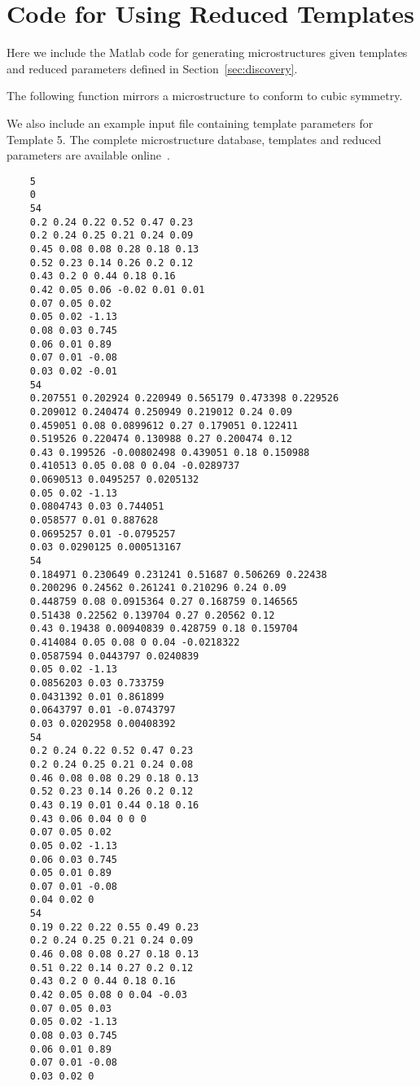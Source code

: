 \chapter{Code for Using Reduced Templates}
Here we include the Matlab code for generating microstructures given templates and reduced parameters defined in Section~\ref{sec:discovery}.

The following function mirrors a microstructure to conform to cubic symmetry.

We also include an example input file containing template parameters for Template 5.
The complete microstructure database, templates and reduced parameters are available online~\citep{microDatabase}.
\begin{verbatim}
	5
	0
	54
	0.2 0.24 0.22 0.52 0.47 0.23 
	0.2 0.24 0.25 0.21 0.24 0.09 
	0.45 0.08 0.08 0.28 0.18 0.13 
	0.52 0.23 0.14 0.26 0.2 0.12 
	0.43 0.2 0 0.44 0.18 0.16 
	0.42 0.05 0.06 -0.02 0.01 0.01 
	0.07 0.05 0.02 
	0.05 0.02 -1.13 
	0.08 0.03 0.745 
	0.06 0.01 0.89 
	0.07 0.01 -0.08 
	0.03 0.02 -0.01
	54
	0.207551 0.202924 0.220949 0.565179 0.473398 0.229526 
	0.209012 0.240474 0.250949 0.219012 0.24 0.09 
	0.459051 0.08 0.0899612 0.27 0.179051 0.122411 
	0.519526 0.220474 0.130988 0.27 0.200474 0.12 
	0.43 0.199526 -0.00802498 0.439051 0.18 0.150988 
	0.410513 0.05 0.08 0 0.04 -0.0289737 
	0.0690513 0.0495257 0.0205132 
	0.05 0.02 -1.13 
	0.0804743 0.03 0.744051 
	0.058577 0.01 0.887628 
	0.0695257 0.01 -0.0795257 
	0.03 0.0290125 0.000513167 
	54
	0.184971 0.230649 0.231241 0.51687 0.506269 0.22438 
	0.200296 0.24562 0.261241 0.210296 0.24 0.09 
	0.448759 0.08 0.0915364 0.27 0.168759 0.146565 
	0.51438 0.22562 0.139704 0.27 0.20562 0.12 
	0.43 0.19438 0.00940839 0.428759 0.18 0.159704 
	0.414084 0.05 0.08 0 0.04 -0.0218322 
	0.0587594 0.0443797 0.0240839 
	0.05 0.02 -1.13 
	0.0856203 0.03 0.733759 
	0.0431392 0.01 0.861899 
	0.0643797 0.01 -0.0743797 
	0.03 0.0202958 0.00408392 
	54
	0.2 0.24 0.22 0.52 0.47 0.23 
	0.2 0.24 0.25 0.21 0.24 0.08 
	0.46 0.08 0.08 0.29 0.18 0.13 
	0.52 0.23 0.14 0.26 0.2 0.12 
	0.43 0.19 0.01 0.44 0.18 0.16 
	0.43 0.06 0.04 0 0 0 
	0.07 0.05 0.02 
	0.05 0.02 -1.13 
	0.06 0.03 0.745 
	0.05 0.01 0.89 
	0.07 0.01 -0.08 
	0.04 0.02 0
	54
	0.19 0.22 0.22 0.55 0.49 0.23 
	0.2 0.24 0.25 0.21 0.24 0.09 
	0.46 0.08 0.08 0.27 0.18 0.13 
	0.51 0.22 0.14 0.27 0.2 0.12 
	0.43 0.2 0 0.44 0.18 0.16 
	0.42 0.05 0.08 0 0.04 -0.03
	0.07 0.05 0.03 
	0.05 0.02 -1.13 
	0.08 0.03 0.745 
	0.06 0.01 0.89 
	0.07 0.01 -0.08 
	0.03 0.02 0	
\end{verbatim}